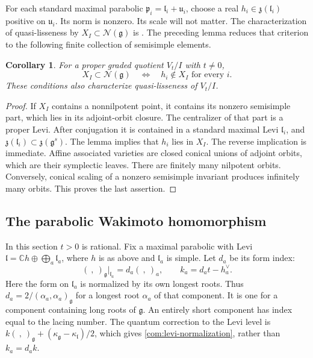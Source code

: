 \documentclass[11pt,a4paper]{amsart}
\numberwithin{equation}{section}
\newtheorem{corollary}[theorem]{Corollary}
\theoremstyle{definition}
\theoremstyle{remark}
\newcommand{\C}{\mathbb C}
\newcommand{\g}{\mathfrak g}
\newcommand{\uu}{\mathfrak u}
\newcommand{\lev}{\mathfrak l}
\newcommand{\N}{\mathcal N}
\begin{document}
For each standard maximal parabolic $\mathfrak p_i=\lev_i+\uu_i$,
choose a real $h_i\in\mathfrak z(\lev_i)$ positive on $\uu_i$.
Its norm is nonzero. Its scale will not matter.
The characterization of quasi-lisseness by $X_I\subset\N(\g)$ is
\cite[Lemma~6.1]{AK}. The preceding lemma reduces that criterion to
the following finite collection of semisimple elements.
\begin{corollary}\label{com:finite-centers}
For a proper graded quotient $V_t/I$ with $t\ne0$,
$$
 X_I\subset\N(\g)
 \quad\Longleftrightarrow\quad h_i\notin X_I\text{ for every }i.
$$
These conditions also characterize quasi-lisseness of $V_t/I$.
\end{corollary}
\begin{proof}
If $X_I$ contains a nonnilpotent point, it contains its nonzero
semisimple part, which lies in its adjoint-orbit closure. The centralizer
of that part is a proper Levi. After conjugation it is contained in a
standard maximal Levi $\lev_i$, and
$\mathfrak z(\lev_i)\subset\mathfrak z(\g^s)$.
The lemma implies that $h_i$ lies in $X_I$. The reverse implication is immediate.
Affine associated varieties are closed conical unions of adjoint orbits,
which are their symplectic leaves. There are finitely many nilpotent
orbits. Conversely, conical scaling of a nonzero semisimple invariant
produces infinitely many orbits. This proves the last assertion.
\end{proof}

\subsection{The parabolic Wakimoto homomorphism}\label{com:parabolic}
In this section $t>0$ is rational. Fix a maximal parabolic with Levi
$\lev=\C h\oplus\bigoplus_a\lev_a$, where $h$ is as above and
$\lev_a$ is simple. Let $d_a$ be its form index:
\begin{equation}\label{com:levi-normalization}
 (\ ,\ )_{\g}|_{\lev_a}=d_a(\ ,\ )_a,
 \qquad k_a=d_at-h_a^\vee.
\end{equation}
Here the form on $\lev_a$ is normalized by its own longest roots.
Thus $d_a=2/(\alpha_a,\alpha_a)_\g$ for a longest root $\alpha_a$
of that component. It is one for a component containing long roots
of $\g$. An entirely short component has index equal to the lacing number.
The quantum correction to the Levi level is
$k(\ ,\ )_\g+(\kappa_\g-\kappa_\lev)/2$, which gives
\eqref{com:levi-normalization}, rather than $k_a=d_ak$.
\end{document}
